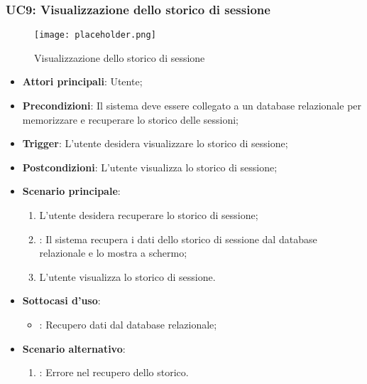 \newpage
\hypertarget{UC9}{}
\subsubsection{UC9: Visualizzazione dello storico di sessione}

\begin{figure}[h]
    \centering
    \texttt{[image: placeholder.png]}
    \caption{Visualizzazione dello storico di sessione}
\end{figure}

\begin{itemize}
    \item \textbf{Attori principali}: Utente;
    \item \textbf{Precondizioni}: Il sistema deve essere collegato a un database relazionale per memorizzare e recuperare lo storico delle sessioni;
    \item \textbf{Trigger}: L'utente desidera visualizzare lo storico di sessione;
    \item \textbf{Postcondizioni}: L'utente visualizza lo storico di sessione;
    \item \textbf{Scenario principale}:
    \begin{enumerate}
        \item L'utente desidera recuperare lo storico di sessione;
        \item {}: Il sistema recupera i dati dello storico di sessione dal database relazionale e lo mostra a schermo;
        \item L'utente visualizza lo storico di sessione.
    \end{enumerate}

    \item \textbf{Sottocasi d'uso}:
    \begin{itemize}
        \item {}: Recupero dati dal database relazionale;
    \end{itemize}
    \item \textbf{Scenario alternativo}:
    \begin{enumerate}
        \item {}: Errore nel recupero dello storico.
    \end{enumerate}
\end{itemize}

\hypertarget{UC10}{}
